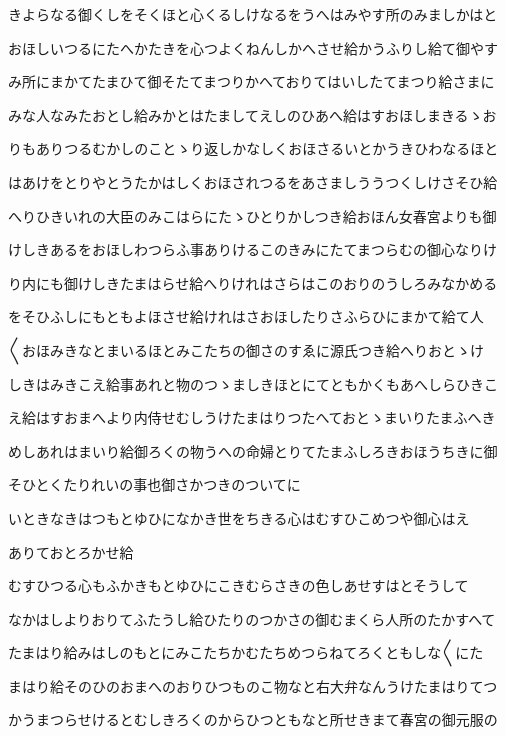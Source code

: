 \documentclass[a4paper,11pt,landscape]{ltjtarticle}
\begin{document}
\par\medskip
きよらなる御くしをそくほと心くるしけなるをうへはみやす所のみましかはと
\par\medskip
おほしいつるにたへかたきを心つよくねんしかへさせ給かうふりし給て御やす
\par\medskip
み所にまかてたまひて御そたてまつりかへておりてはいしたてまつり給さまに
\par\medskip
みな人なみたおとし給みかとはたましてえしのひあへ給はすおほしまきるゝお
\par\medskip
りもありつるむかしのことゝり返しかなしくおほさるいとかうきひわなるほと
\par\medskip
はあけをとりやとうたかはしくおほされつるをあさましううつくしけさそひ給
\par\medskip
へりひきいれの大臣のみこはらにたゝひとりかしつき給おほん女春宮よりも御
\par\medskip
けしきあるをおほしわつらふ事ありけるこのきみにたてまつらむの御心なりけ
\par\medskip
り内にも御けしきたまはらせ給へりけれはさらはこのおりのうしろみなかめる
\par\medskip
をそひふしにもともよほさせ給けれはさおほしたりさふらひにまかて給て人
\par\medskip
〱おほみきなとまいるほとみこたちの御さのすゑに源氏つき給へりおとゝけ
\par\medskip
しきはみきこえ給事あれと物のつゝましきほとにてともかくもあへしらひきこ
\par\medskip
え給はすおまへより内侍せむしうけたまはりつたへておとゝまいりたまふへき
\par\medskip
めしあれはまいり給御ろくの物うへの命婦とりてたまふしろきおほうちきに御
\par\medskip
そひとくたりれいの事也御さかつきのついてに
\par\medskip
いときなきはつもとゆひになかき世をちきる心はむすひこめつや御心はえ
\par\medskip
ありておとろかせ給
\par\medskip
むすひつる心もふかきもとゆひにこきむらさきの色しあせすはとそうして
\par\medskip
なかはしよりおりてふたうし給ひたりのつかさの御むまくら人所のたかすへて
\par\medskip
たまはり給みはしのもとにみこたちかむたちめつらねてろくともしな〱にた
\par\medskip
まはり給そのひのおまへのおりひつものこ物なと右大弁なんうけたまはりてつ
\par\medskip
かうまつらせけるとむしきろくのからひつともなと所せきまて春宮の御元服の
\end{document}
